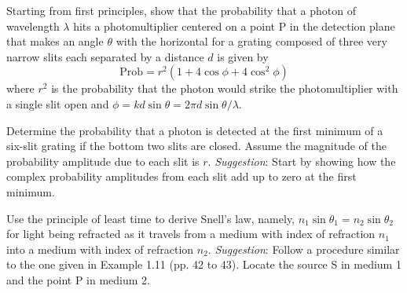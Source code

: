 \documentclass[12pt,letterpaper]{hmcpset}
\begin{document}
	\begin{problem}[T1.34:]
		Starting from first principles, show that the probability that a photon of wavelength $\lambda$ hits a photomultiplier centered on a point P in the detection plane that makes an angle $\theta$ with the horizontal for a grating composed of three very narrow slits each separated by a distance $d$ is given by
		\[\textrm{Prob} =r^2(1+ 4\cos{\phi} + 4\cos^2{\phi})\]
		where $r^2$ is the probability that the photon would strike the photomultiplier with a single slit open and $\phi = kd\sin{\theta} = 2\pi d\sin{\theta/\lambda}$.
	\end{problem}
	\clearpage



	\begin{problem}[T1.37:]
		Determine the probability that a photon is detected at the first minimum of a six-slit grating if the bottom two slits are closed.
		Assume the magnitude of the probability amplitude due to each slit is $r$.
		\textit{Suggestion}: Start by showing how the complex probability amplitudes from each slit add up to zero at the first minimum.
	\end{problem}
	\clearpage



	\begin{problem}[T1.43:]
		Use the principle of least time to derive Snell's law, namely, $n_1\sin{\theta_1} = n_2\sin{\theta_2}$ for light being refracted as it travels from a medium with index of refraction $n_1$ into a medium with index of refraction $n_2$.
		\textit{Suggestion}: Follow a procedure similar to the one given in Example 1.11 (pp. 42 to 43).
		Locate the source S in medium 1 and the point P in medium 2.
	\end{problem}
	\clearpage
\end{document}
